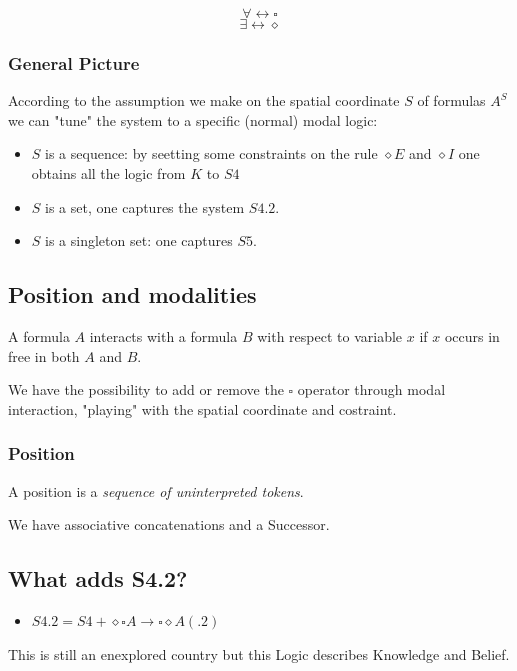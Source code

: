 \documentclass[a4paper]{article}
\begin{document}
\[\forall \leftrightarrow \square\]
\[\exists \leftrightarrow \diamond\]


\subsubsection{General Picture}

According to the assumption we make on the spatial coordinate $S$ of formulas $A^S$ we can "tune" the system to a specific (normal) modal logic:
\begin{itemize}
    \item $S$ is a sequence: by seetting some constraints on the rule $\diamond E$ and $\diamond I$ one obtains all the logic from $K$ to $S4$
    \item $S$ is a set, one captures the system $S4.2$.
    \item $S$ is a singleton set: one captures $S5$.
\end{itemize}

\subsection{Position and modalities}

\begin{lemma}
    A formula $A$ interacts with a formula $B$ with respect to variable $x$ if $x$ occurs in free in both $A$ and $B$.
\end{lemma}
We have the possibility to add or remove the $\square$ operator through modal interaction, "playing" with the spatial coordinate and costraint.
\subsubsection{Position}

\begin{definition}
    A position is a \textit{sequence of uninterpreted tokens}.
\end{definition}
\noindent
We have associative concatenations and a Successor.

\subsection{What adds S4.2?}

\begin{itemize}
    \item $S4.2 = S4 + \diamond \square A \rightarrow \square \diamond A (.2)$ 
\end{itemize}
This is still an enexplored country but this Logic describes Knowledge and Belief.
\end{document}
